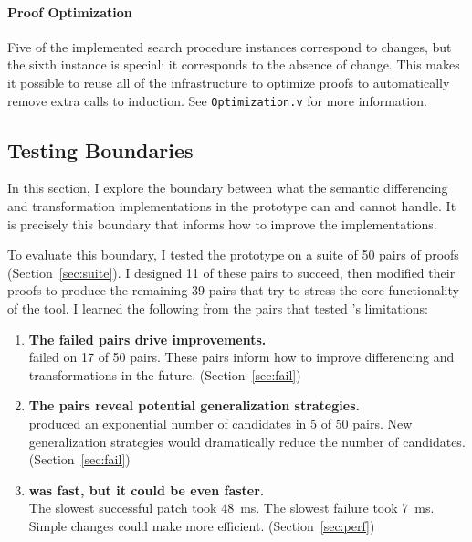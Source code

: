
\paragraph{Proof Optimization}
Five of the implemented search procedure instances correspond to changes, but the sixth instance is special:
it corresponds to the absence of change.
This makes it possible to reuse all of the \sysname infrastructure to optimize proofs
to automatically remove extra calls to induction.
See \lstinline{Optimization.v} for more information.

\subsection{Testing Boundaries}
\label{sec:bound-eval}

In this section, I explore the boundary between what the semantic differencing
and transformation implementations in the \sysname prototype can and cannot handle.
It is precisely this boundary that informs how to improve the implementations.

To evaluate this boundary, I tested the \sysname prototype on a suite of 50 pairs of proofs (Section~\ref{sec:suite}).
I designed 11 of these pairs to succeed, then modified their proofs to produce the remaining 39 pairs
that try to stress the core functionality of the tool.
I learned the following from the pairs
that tested \sysname's limitations:

\begin{enumerate}
\item \textbf{The failed pairs drive improvements.} \\
\sysname failed on 17 of 50 pairs. These pairs inform how to improve differencing and transformations in the future. (Section~\ref{sec:fail})
\item \textbf{The pairs reveal potential generalization strategies.} \\
\sysname produced an exponential number of candidates in 5 of 50 pairs.
New generalization strategies would dramatically reduce the number of candidates. (Section~\ref{sec:fail})
\item {} \textbf{was fast, but it could be even faster.} \\
The slowest successful patch took \SI{48}{\ms}. The slowest failure took \SI{7}{\ms}.
Simple changes could make \sysname more efficient. (Section~\ref{sec:perf})
\end{enumerate}

